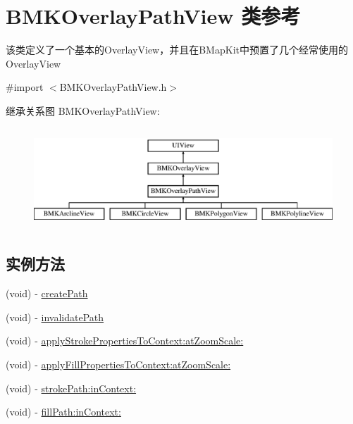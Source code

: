 \hypertarget{interface_b_m_k_overlay_path_view}{\section{B\-M\-K\-Overlay\-Path\-View 类参考}
\label{interface_b_m_k_overlay_path_view}
}


该类定义了一个基本的\-Overlay\-View，并且在\-B\-Map\-Kit中预置了几个经常使用的\-Overlay\-View  




{\ttfamily \#import $<$B\-M\-K\-Overlay\-Path\-View.\-h$>$}

继承关系图 B\-M\-K\-Overlay\-Path\-View\-:\begin{figure}[H]
\begin{center}
\leavevmode
\includegraphics[height=3.835616cm]{interface_b_m_k_overlay_path_view}
\end{center}
\end{figure}
\subsection*{实例方法}
\begin{DoxyCompactItemize}
\item 
(void) -\/ \hyperlink{interface_b_m_k_overlay_path_view_a4e76c3b9524b555c2118ae18f6057605}{create\-Path}
\item 
(void) -\/ \hyperlink{interface_b_m_k_overlay_path_view_ac773bae0823405dcf5b78a3361fa2d56}{invalidate\-Path}
\item 
(void) -\/ \hyperlink{interface_b_m_k_overlay_path_view_a2acbf6bd9401c2904148b7b6cf85c6e9}{apply\-Stroke\-Properties\-To\-Context\-:at\-Zoom\-Scale\-:}
\item 
(void) -\/ \hyperlink{interface_b_m_k_overlay_path_view_af549bea37a94164a088826f9a962e08c}{apply\-Fill\-Properties\-To\-Context\-:at\-Zoom\-Scale\-:}
\item 
(void) -\/ \hyperlink{interface_b_m_k_overlay_path_view_a482e5fe24f04335d090b32d449ef6dc4}{stroke\-Path\-:in\-Context\-:}
\item 
(void) -\/ \hyperlink{interface_b_m_k_overlay_path_view_a036abde24b9ae921f209cde884dad49b}{fill\-Path\-:in\-Context\-:}
\end{DoxyCompactItemize}
